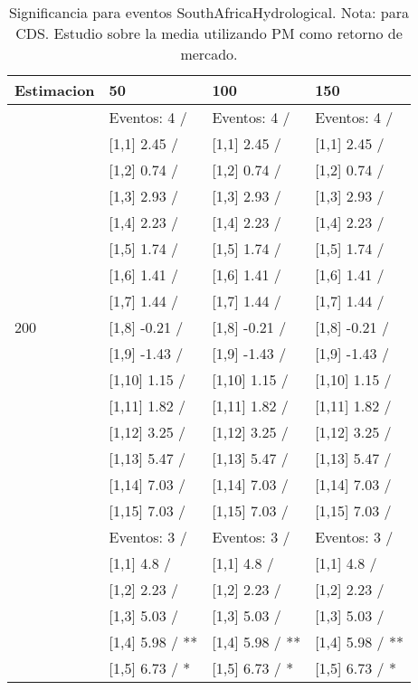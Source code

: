 \begin{table}

\caption{Significancia para eventos SouthAfricaHydrological. Nota: para CDS. Estudio sobre la media utilizando PM como retorno de mercado.}
\centering
\begin{tabular}[t]{llll}
\toprule
Estimacion & 50 & 100 & 150\\
\midrule
 & Eventos:  4 / & Eventos:  4 / & Eventos:  4 /\\
 & {}[1,1] 2.45  / & {}[1,1] 2.45  / & {}[1,1] 2.45  /\\
 & {}[1,2] 0.74  / & {}[1,2] 0.74  / & {}[1,2] 0.74  /\\
 & {}[1,3] 2.93  / & {}[1,3] 2.93  / & {}[1,3] 2.93  /\\
 & {}[1,4] 2.23  / & {}[1,4] 2.23  / & {}[1,4] 2.23  /\\
\addlinespace
 & {}[1,5] 1.74  / & {}[1,5] 1.74  / & {}[1,5] 1.74  /\\
 & {}[1,6] 1.41  / & {}[1,6] 1.41  / & {}[1,6] 1.41  /\\
 & {}[1,7] 1.44  / & {}[1,7] 1.44  / & {}[1,7] 1.44  /\\
200 & {}[1,8] -0.21  / & {}[1,8] -0.21  / & {}[1,8] -0.21  /\\
 & {}[1,9] -1.43  / & {}[1,9] -1.43  / & {}[1,9] -1.43  /\\
\addlinespace
 & {}[1,10] 1.15  / & {}[1,10] 1.15  / & {}[1,10] 1.15  /\\
 & {}[1,11] 1.82  / & {}[1,11] 1.82  / & {}[1,11] 1.82  /\\
 & {}[1,12] 3.25  / & {}[1,12] 3.25  / & {}[1,12] 3.25  /\\
 & {}[1,13] 5.47  / & {}[1,13] 5.47  / & {}[1,13] 5.47  /\\
 & {}[1,14] 7.03  / & {}[1,14] 7.03  / & {}[1,14] 7.03  /\\
\addlinespace
 & {}[1,15] 7.03  / & {}[1,15] 7.03  / & {}[1,15] 7.03  /\\
 & Eventos:  3 / & Eventos:  3 / & Eventos:  3 /\\
 & {}[1,1] 4.8  / & {}[1,1] 4.8  / & {}[1,1] 4.8  /\\
 & {}[1,2] 2.23  / & {}[1,2] 2.23  / & {}[1,2] 2.23  /\\
 & {}[1,3] 5.03  / & {}[1,3] 5.03  / & {}[1,3] 5.03  /\\
\addlinespace
 & {}[1,4] 5.98  / ** & {}[1,4] 5.98  / ** & {}[1,4] 5.98  / **\\
 & {}[1,5] 6.73  / * & {}[1,5] 6.73  / * & {}[1,5] 6.73  / *\\

\end{tabular}
\end{table}
